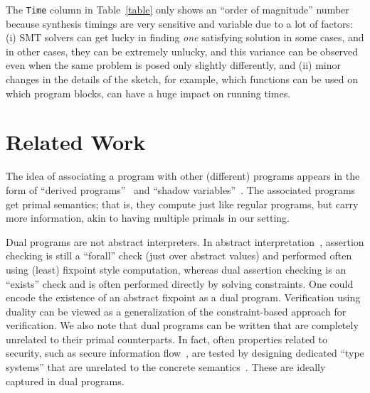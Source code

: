 \documentclass[preprint]{sig-alternate-05-2015}
\begin{document}
The {\tt{Time}} column in Table~\ref{table} only shows an
``order of magnitude'' number because synthesis timings are very sensitive and
variable due to a lot of factors: (i) SMT solvers can get lucky in finding {\em{one}}
satisfying solution in some cases, and in other cases, they can be extremely unlucky,
and this variance can be observed even when the same problem is
posed only slightly differently, and (ii) minor changes in the details of the sketch,
for example, which functions can be used on which program blocks, can have a huge
impact on running times.


\section{Related Work}

The idea of associating a program with other (different) programs
appears in the form of ``derived programs''~\cite{clt92}
and ``shadow variables''~\cite{DBLP:journals/scp/Morgan09}.
The associated programs get primal semantics; that is, they
compute just like regular programs, but carry more information, akin to
having multiple primals in our setting.

Dual programs are not abstract interpreters. In abstract interpretation~\cite{CousotCousot77:POPL},
assertion checking is still a ``forall'' check (just over abstract values) and performed
often using (least) fixpoint style computation,
whereas dual assertion checking is an ``exists'' check and is often performed directly
by solving constraints.  One could encode the existence of an abstract fixpoint as a 
dual program.  Verification using duality can be viewed as a  generalization of the 
constraint-based approach for verification.  We also note that dual programs
can be written that are completely unrelated to their primal counterparts.
In fact, often properties related to security, such as
secure information flow~\cite{DBLP:journals/cacm/DenningD77,DBLP:journals/jsac/SabelfeldM03},
are tested by designing 
dedicated ``type systems'' that are unrelated
to the concrete semantics~\cite{DBLP:conf/csfw/Smith01,DBLP:conf/csfw/MalozemoffKG14}.
These are ideally captured in dual programs.
\end{document}
